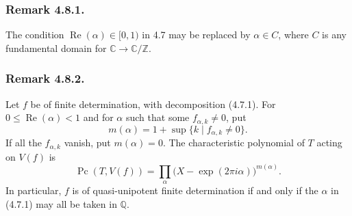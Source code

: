 \subsubsection*{Remark 4.8.1.}
The condition $\operatorname{Re}(\alpha)\in[0,1)$ in 4.7 may be
replaced by $\alpha\in C$, where $C$ is any fundamental domain for
$\mathbb C\longrightarrow\mathbb C/\mathbb Z$.

\subsubsection*{Remark 4.8.2.}
Let $f$ be of finite determination, with decomposition (4.7.1).  For
$0\leq\operatorname{Re}(\alpha)<1$ and for $\alpha$ such that some
$f_{\alpha,k}\ne0$, put
\[
m(\alpha)=1+\sup\{k\mid f_{\alpha,k}\ne0\}.
\]
If all the $f_{\alpha,k}$ vanish, put $m(\alpha)=0$.  The
characteristic polynomial of $T$ acting on $V(f)$ is
\[
\operatorname{Pc}(T,V(f))
=\prod_\alpha\bigl(X-\exp(2\pi i\alpha)\bigr)^{m(\alpha)}.
\]
In particular, $f$ is of quasi-unipotent finite determination if and
only if the $\alpha$ in (4.7.1) may all be taken in $\mathbb Q$.
